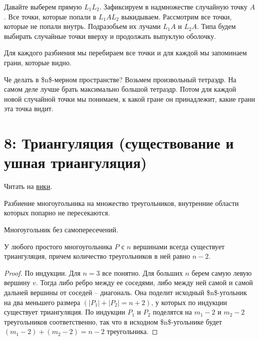\documentclass[11pt]{article}
\begin{document}
Давайте выберем прямую \(L_1L_2\). Зафиксируем в надмножестве случайную
точку \(A\). Все точки, которые попали в \(L_1AL_2\)
выкидываем. Рассмотрим все точки, которые не попали
внутрь. Подразобьем их лучами \(L_1A\) и \(L_2A\). Типа будем выбирать
случайные точки вверху и продолжать выпуклую оболочку.

Для каждого разбиения мы перебираем все точки и для каждой мы
запоминаем грани, которые видно.

Че делать в \$n\$-мерном пространстве? Возьмем произвольный
тетраэдр. На самом деле лучше брать максимально большой
тетраэдр. Потом для каждой новой случайной точки мы понимаем, к
какой гране он принадлежит, какие грани эта точка видит.
\section{{\bfseries{}} 8:  Триангуляция (существование и ушная триангуляция)}
\label{sec:orgheadline32}
Читать на \href{http://neerc.ifmo.ru/wiki/index.php?title=Триангуляция_полигонов_(ушная_\%2B_монотонная)#.D0.A2.D0.B5.D0.BE.D1.80.D0.B5.D0.BC.D0.B0_.D0.BE_.D1.81.D1.83.D1.89.D0.B5.D1.81.D1.82.D0.B2.D0.BE.D0.B2.D0.B0.D0.BD.D0.B8.D0.B8_.D1.82.D1.80.D0.B8.D0.B0.D0.BD.D0.B3.D1.83.D0.BB.D1.8F.D1.86.D0.B8.D0.B8}{вики}.

\begin{defn}[триангуляция]
Разбиение многоугольника на множество
треугольников, внутренние области которых попарно не
пересекаются.
\end{defn}

\begin{defn}
Многоугольник без самопересечений.
\end{defn}

\begin{thm}
У любого простого многоугольника \(P\) с \(n\) вершинами всегда
существует триангуляция, причем количество треугольников в ней
равно \(n-2\).
\end{thm}

\begin{proof}
По индукции. Для \(n=3\) все понятно. Для больших \(n\) берем самую
левую вершину \(v\). Тогда либо ребро между ее соседями, либо между
ней самой и самой дальней вершины от соседей \--- диагональ. Она
поделит исходный \$n\$-угольник на два меньшего размера
\((|P_1| + |P_2| = n + 2)\), у которых по индукции существует
триангуляция. По индукции \(P_1\) и \(P_2\) поделятся на \(m_1 - 2\) и
\(m_2 - 2\) треугольников соответственно, так что в исходном
\$n\$-угольнике будет \((m_1 - 2) + (m_2 - 2) = n - 2\) треугольника.
\end{proof}
\end{document}
